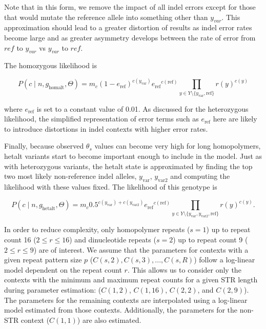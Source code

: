 \documentclass{article}
\begin{document}
Note that in this form, we remove the impact of all indel errors except for those that would mutate the reference allele into something other than $y_{var}$. This approximation should lead to a greater distortion of results as indel error rates become large and as greater asymmetry develops between the rate of error from $ref$ to $y_{var}$ vs $y_{var}$ to $ref$.

The homozygous likelihood is

\begin{equation*}
P (c \mid n, g_{\text{homalt}}, \Theta) = m_c (1-e_{\text{ref}})^{c(y_{\text{var}})} {e_{\text{ref}}}^{c(\text{ref})} \prod_{y \in Y \setminus \{y_{\text{var}},\text{ref}\}} r(y)^{c(y)}
\end{equation*}

where $e_{\text{ref}}$ is set to a constant value of 0.01. As discussed for the heterozygous likelihood, the simplified representation of error terms such as $e_{\text{ref}}$ here are likely to introduce distortions in indel contexts with higher error rates.

Finally, because observed $\theta_s$ values can become very high for long homopolymers, hetalt variants start to become important enough to include in the model. Just as with heterozygous variants, the hetalt state is approximated by finding the top two most likely non-reference indel alleles, $y_{\text{var}}$, $y_{\text{var2}}$ and computing the likelihood with these values fixed. The likelihood of this genotype is

\begin{equation*}
P (c \mid n, g_{\text{hetalt}}, \Theta) = m_c 0.5^{c(y_{\text{var}})+c(y_{\text{var2}})} {e_{\text{ref}}}^{c(\text{ref})} \prod_{y \in Y \setminus \{y_{\text{var}},y_{\text{var2}},\text{ref}\}} r(y)^{c(y)}.
\end{equation*}

In order to reduce complexity, only homopolymer repeats ($s=1$) up to repeat count 16 ($2\leq r \leq 16$) and dinucleotide repeats ($s=2$) up to repeat count 9 ($2\leq r \leq 9$) are of interest. We assume that the parameters for contexts with a given repeat pattern size $p$ ($C(s,2),C(s,3),...,C(s,R)$) follow a log-linear model dependent on the repeat count $r$. This allows us to consider only the contexts with the minimum and maximum repeat counts for a given STR length during parameter estimation: ($C(1,2)$, $C(1,16)$, $C(2,2)$, and $C(2,9)$). The parameters for the remaining contexts are interpolated using a log-linear model estimated from those contexts. Additionally, the parameters for the non-STR context ($C(1,1)$) are also estimated.
\end{document}
